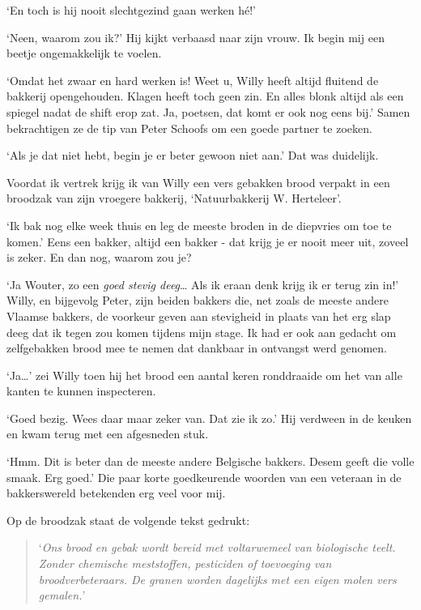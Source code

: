 \documentclass[
  11pt,
  dutch,
]{memoir}
\begin{document}
`En toch is hij nooit slechtgezind gaan werken hé!'

`Neen, waarom zou ik?' Hij kijkt verbaasd naar zijn vrouw. Ik begin mij
een beetje ongemakkelijk te voelen.

`Omdat het zwaar en hard werken is! Weet u, Willy heeft altijd fluitend
de bakkerij opengehouden. Klagen heeft toch geen zin. En alles blonk
altijd als een spiegel nadat de shift erop zat. Ja, poetsen, dat komt er
ook nog eens bij.' Samen bekrachtigen ze de tip van Peter Schoofs om een
goede partner te zoeken.

`Als je dat niet hebt, begin je er beter gewoon niet aan.' Dat was
duidelijk.

Voordat ik vertrek krijg ik van Willy een vers gebakken brood verpakt in
een broodzak van zijn vroegere bakkerij, `Natuurbakkerij W. Herteleer'.

`Ik bak nog elke week thuis en leg de meeste broden in de diepvries om
toe te komen.' Eens een bakker, altijd een bakker - dat krijg je er
nooit meer uit, zoveel is zeker. En dan nog, waarom zou je?

`Ja Wouter, zo een \emph{goed stevig deeg}\ldots{} Als ik eraan denk
krijg ik er terug zin in!' Willy, en bijgevolg Peter, zijn beiden
bakkers die, net zoals de meeste andere Vlaamse bakkers, de voorkeur
geven aan stevigheid in plaats van het erg slap deeg dat ik tegen zou
komen tijdens mijn stage. Ik had er ook aan gedacht om zelfgebakken
brood mee te nemen dat dankbaar in ontvangst werd genomen.

`Ja\ldots{}' zei Willy toen hij het brood een aantal keren ronddraaide
om het van alle kanten te kunnen inspecteren.

`Goed bezig. Wees daar maar zeker van. Dat zie ik zo.' Hij verdween in
de keuken en kwam terug met een afgesneden stuk.

`Hmm. Dit is beter dan de meeste andere Belgische bakkers. Desem geeft
die volle smaak. Erg goed.' Die paar korte goedkeurende woorden van een
veteraan in de bakkerswereld betekenden erg veel voor mij.

Op de broodzak staat de volgende tekst gedrukt:

\begin{quote}
`\emph{Ons brood en gebak wordt bereid met voltarwemeel van biologische
teelt. Zonder chemische meststoffen, pesticiden of toevoeging van
broodverbeteraars. De granen worden dagelijks met een eigen molen vers
gemalen.}'
\end{quote}
\end{document}
